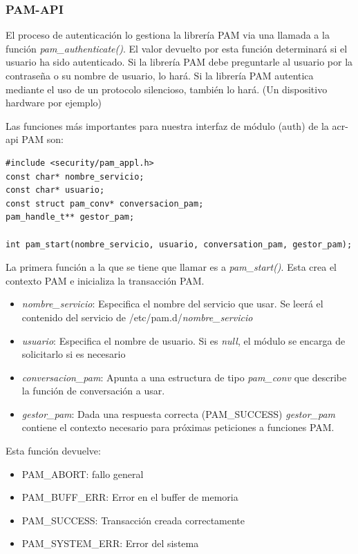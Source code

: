\documentclass[twoside, titlepage, 12pt, a4paper]{article}
\begin{document}
\subsubsection{PAM-API}
El proceso de autenticación lo gestiona la librería PAM via una llamada a la función \textit{pam\_authenticate()}. El valor devuelto por esta función determinará si el usuario ha sido autenticado. Si la librería PAM debe preguntarle al usuario por la contraseña o su nombre de usuario, lo hará. Si la librería PAM autentica mediante el uso de un protocolo silencioso, también lo hará. (Un dispositivo hardware por ejemplo)\cite{linux-pam-application} \par
Las funciones más importantes para nuestra interfaz de módulo (auth) de la \gls{acr-api} PAM son:
\begin{lstlisting}
#include <security/pam_appl.h>
const char* nombre_servicio;
const char* usuario;
const struct pam_conv* conversacion_pam;
pam_handle_t** gestor_pam;

int pam_start(nombre_servicio, usuario, conversation_pam, gestor_pam);
\end{lstlisting}
La primera función a la que se tiene que llamar es a \textit{pam\_start()}. Esta crea el contexto PAM e inicializa la transacción PAM.\par
\begin{itemize}
	\item{\textit{nombre\_servicio}: Especifica el nombre del servicio que usar. Se leerá el contenido del servicio de /etc/pam.d/\textit{nombre\_servicio}}
	\item{\textit{usuario}: Especifica el nombre de usuario. Si es \textit{null}, el módulo se encarga de solicitarlo si es necesario}
	\item{\textit{conversacion\_pam}: Apunta a una estructura de tipo \textit{pam\_conv} que describe la función de conversación a usar.}
	\item{\textit{gestor\_pam}: Dada una respuesta correcta (PAM\_SUCCESS) \textit{gestor\_pam} contiene el contexto necesario para próximas peticiones a funciones PAM.}
\end{itemize} 
Esta función devuelve:
\begin{itemize}
	\item{PAM\_ABORT: fallo general}
	\item{PAM\_BUFF\_ERR: Error en el buffer de memoria}
	\item{PAM\_SUCCESS: Transacción creada correctamente}
	\item{PAM\_SYSTEM\_ERR: Error del sistema}
\end{itemize} \par
\end{document}
